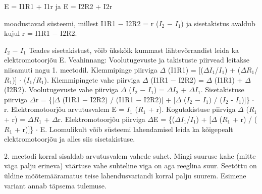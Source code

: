 E = I1R1 + I1r ja E = I2R2 + I2r

moodustavad süsteemi, millest I1R1 $-$ I2R2 = r ($I_2$ $-$ $I_1$) ja sisetakistus avaldub kujul r = I1R1 $-$ I2R2.

$I_2$ $-$ $I_1$ Teades sisetakistust, võib ükskõik kummast lähtevõrrandist leida ka elektromotoorjõu E. Veahinnang: Voolutugevuste ja takistuste piirvead leitakse niisamuti nagu 1. meetodil. Klemmipinge piirviga $\Delta$ (I1R1) = [($\Delta$$I_1$/$I_1$) + ($\Delta$$R_1$/$R_1$)] $\cdot$ ($I_1$/$R_1$). Klemmipingete vahe piirviga $\Delta$ (I1R1 $-$ I2R2) = $\Delta$ (I1R1) + $\Delta$ (I2R2). Voolutugevuste vahe piirviga $\Delta$ ($I_2$ $-$ $I_1$) = $\Delta$$I_2$ + $\Delta$$I_1$. Sisetakistuse piirviga $\Delta$r = \{[$\Delta$ (I1R1 $-$ I2R2) / (I1R1 $-$ I2R2)] + [$\Delta$ ($I_2$ $-$ $I_1$) / ($I_2$ - $I_1$)]\} $\cdot$ r. Elektromotoorjõu arvutusvalem E = $I_1$ ($R_1$ + r). Kogutakistuse piirviga $\Delta$ ($R_1$ + r) = $\Delta$$R_1$ + $\Delta$r. Elektromotoorjõu piirviga $\Delta$E = \{($\Delta$$I_1$/$I_1$) + [$\Delta$ ($R_1$ + r) / ($R_1$ + r)]\} $\cdot$ E. Loomulikult võib süsteemi lahendamisel leida ka kõigepealt elektromotoorjõu ja alles siis sisetakistuse.

2. meetodi korral sisaldab arvutusvalem vahede suhet. Mingi suuruse kahe (mitte väga palju erineva) väärtuse vahe suhteline viga on aga reeglina suur. Seetõttu on üldine mõõtemääramatus teise lahendusvariandi korral palju suurem. Esimene variant annab täpsema tulemuse.
\probend
